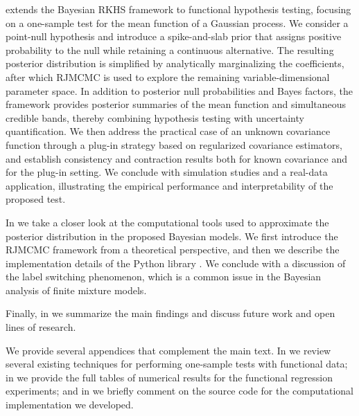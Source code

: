  extends the Bayesian \acs{RKHS} framework to functional hypothesis testing, focusing on a one-sample test for the mean function of a Gaussian process. We consider a point-null hypothesis and introduce a spike-and-slab prior that assigns positive probability to the null while retaining a continuous alternative. The resulting posterior distribution is simplified by analytically marginalizing the coefficients, after which \acs{RJMCMC} is used to explore the remaining variable-dimensional parameter space. In addition to posterior null probabilities and Bayes factors, the framework provides posterior summaries of the mean function and simultaneous credible bands, thereby combining hypothesis testing with uncertainty quantification. We then address the practical case of an unknown covariance function through a plug-in strategy based on regularized covariance estimators, and establish consistency and contraction results both for known covariance and for the plug-in setting. We conclude with simulation studies and a real-data application, illustrating the empirical performance and interpretability of the proposed test.

In  we take a closer look at the computational tools used to approximate the posterior distribution in the proposed Bayesian models. We first introduce the \acs{RJMCMC} framework from a theoretical perspective, and then we describe the implementation details of the Python library  \citep{karnesis2023eryn}. We conclude with a discussion of the label switching phenomenon, which is a common issue in the Bayesian analysis of finite mixture models.

Finally, in  we summarize the main findings and discuss future work and open lines of research.

We provide several appendices that complement the main text. In  we review several existing techniques for performing one-sample tests with functional data; in  we provide the full tables of numerical results for the functional regression experiments; and in  we briefly comment on the source code for the computational implementation we developed.

